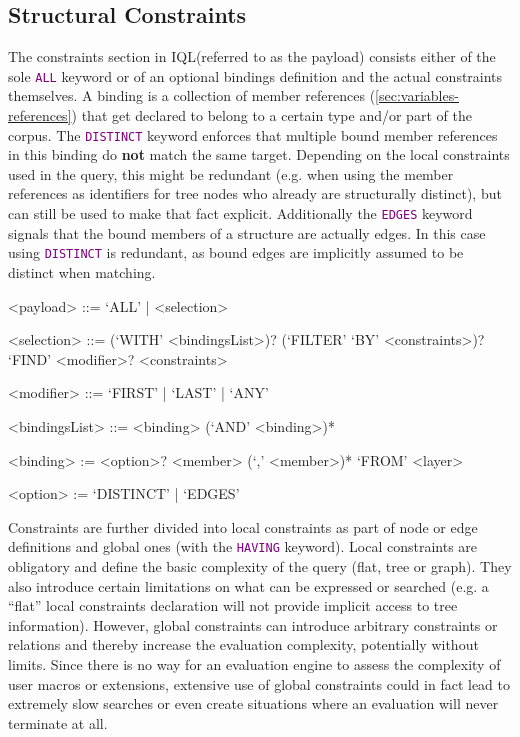 \documentclass[11pt,a4paper,portrait]{article}
\newcommand{\iql}{IQL\xspace}
\newcommand{\keyword}[1]{\textcolor{purple}{\texttt{#1}}}
\begin{document}
\subsection{Structural Constraints}
\label{sec:structural-constraints}

The constraints section in \iql (referred to as the payload) consists either of the sole \keyword{ALL} keyword or of an optional bindings definition and the actual constraints themselves. 
A binding is a collection of member references (\ref{sec:variables-references}) that get declared to belong to a certain type and/or part of the corpus. 
The \keyword{DISTINCT} keyword enforces that multiple bound member references in this binding do \textbf{not} match the same target. 
Depending on the local constraints used in the query, this might be redundant (e.g. when using the member references as identifiers for tree nodes who already are structurally distinct), but can still be used to make that fact explicit. 
Additionally the \keyword{EDGES} keyword signals that the bound members of a structure are actually edges.
In this case using \keyword{DISTINCT} is redundant, as bound edges are implicitly assumed to be distinct when matching.

\begin{grammar}	
	<payload> ::= `ALL' | <selection>
	
	<selection> ::= (`WITH' <bindingsList>)? (`FILTER' `BY' <constraints>)? `FIND' <modifier>? <constraints>
	
	<modifier> ::= `FIRST' | `LAST' | `ANY'
	
	<bindingsList> ::= <binding> (`AND' <binding>)* 
	
	<binding> := <option>? <member> (`,' <member>)* `FROM' <layer>
	
	<option> := `DISTINCT' | `EDGES'
	
\end{grammar}

Constraints are further divided into local constraints as part of node or edge definitions and global ones (with the \keyword{HAVING} keyword). 
Local constraints are obligatory and define the basic complexity of the query (flat, tree or graph). 
They also introduce certain limitations on what can be expressed or searched (e.g. a ``flat'' local constraints declaration will not provide implicit access to tree information). 
However, global constraints can introduce arbitrary constraints or relations and thereby increase the evaluation complexity, potentially without limits. 
Since there is no way for an evaluation engine to assess the complexity of user macros or extensions, extensive use of global constraints could in fact lead to extremely slow searches or even create situations where an evaluation will never terminate at all.
\end{document}
